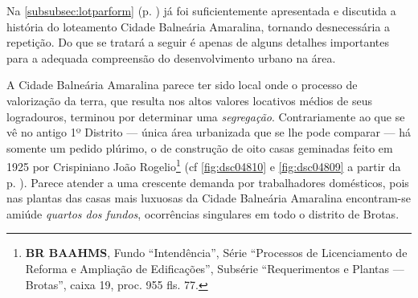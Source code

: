 Na \autoref{subsubsec:lotparform} (p. \pageref{subsubsec:lotparform}) já foi suficientemente apresentada e discutida a história do loteamento Cidade Balneária Amaralina, tornando desnecessária a repetição. Do que se tratará a seguir é apenas de alguns detalhes importantes para a adequada compreensão do desenvolvimento urbano na área. 


A Cidade Balneária Amaralina parece ter sido local onde o processo de valorização da terra, que resulta nos altos valores locativos médios de seus logradouros, terminou por determinar uma \textit{segregação}. Contrariamente ao que se vê no antigo 1º Distrito --- única área urbanizada que se lhe pode comparar --- há somente um pedido plúrimo, o de construção de oito casas geminadas feito em 1925 por Crispiniano João Rogelio\footnote{\textbf{BR BAAHMS}, Fundo ``Intendência'', Série ``Processos de Licenciamento de Reforma e Ampliação de Edificações'', Subsérie ``Requerimentos e Plantas --- Brotas'', caixa 19, proc. 955 fls. 77.} (cf \autoref{fig:dsc04810} e \autoref{fig:dsc04809} a partir da p. \pageref{fig:dsc04810}). Parece atender a uma crescente demanda por trabalhadores domésticos, pois nas plantas das casas mais luxuosas da Cidade Balneária Amaralina encontram-se amiúde \textit{quartos dos fundos}, ocorrências singulares em todo o distrito de Brotas.


